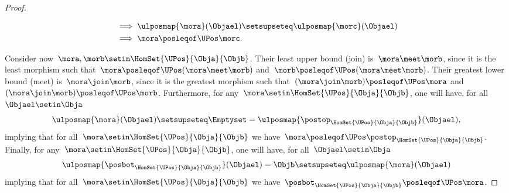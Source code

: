 \begin{proof}
\begin{itemize}
\begin{equation}
\begin{aligned}
                       & \implies \ulposmap{\mora}(\Objael) \setsupseteq \ulposmap{\morc}(\Objael) \\
                       & \implies \mora \posleqof\UPos \morc.
                  \end{aligned}
              \end{equation}
    \end{itemize}
    Consider now~$\mora,\morb \setin \HomSet{\UPos}{\Obja}{\Objb}$.
    Their least upper bound (join) is~$\mora \meet \morb$, since it is the least morphism such that~$\mora \posleqof\UPos (\mora \meet \morb)$ and~$\morb \posleqof\UPos (\mora \meet \morb)$.
    Their greatest lower bound (meet) is~$\mora \join \morb$, since it is the greatest morphism such that~$(\mora \join \morb)\posleqof\UPos \mora $ and~$(\mora \join \morb)\posleqof\UPos \morb$.
    Furthermore, for any~$\mora \setin \HomSet{\UPos}{\Obja}{\Objb}$, one will have, for all~$\Objael \setin \Obja$
    \begin{equation}
        \ulposmap{\mora}(\Objael) \setsupseteq \Emptyset=\ulposmap{\postop_{\HomSet{\UPos}{\Obja}{\Objb}}}(\Objael),
    \end{equation}
    implying that for all~$\mora \setin \HomSet{\UPos}{\Obja}{\Objb}$ we have~$\mora \posleqof\UPos \postop_{\HomSet{\UPos}{\Obja}{\Objb}}$.
    Finally, for any~$\mora \setin \HomSet{\UPos}{\Obja}{\Objb}$, one will have, for all~$\Objael \setin \Obja$
    \begin{equation}
        \ulposmap{\posbot_{\HomSet{\UPos}{\Obja}{\Objb}}}(\Objael)=\Objb \setsupseteq \ulposmap{\mora}(\Objael)
    \end{equation}
    implying that for all~$\mora \setin \HomSet{\UPos}{\Obja}{\Objb}$ we have~$\posbot_{\HomSet{\UPos}{\Obja}{\Objb}}\posleqof\UPos \mora$.
\end{proof}

